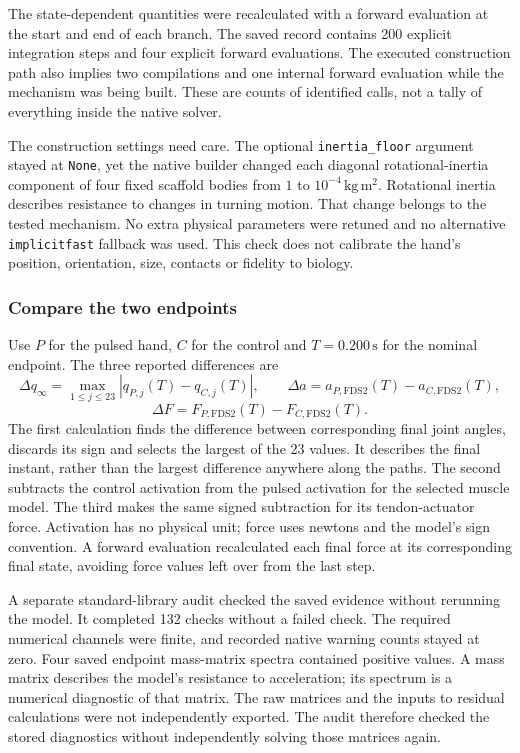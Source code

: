 The state-dependent quantities were recalculated with a forward evaluation at the start and end of each branch. The saved record contains 200 explicit integration steps and four explicit forward evaluations. The executed construction path also implies two compilations and one internal forward evaluation while the mechanism was being built. These are counts of identified calls, not a tally of everything inside the native solver.

The construction settings need care. The optional \texttt{inertia\_floor} argument stayed at \texttt{None}, yet the native builder changed each diagonal rotational-inertia component of four fixed scaffold bodies from $1$ to $10^{-4}\,\mathrm{kg\,m^2}$. Rotational inertia describes resistance to changes in turning motion. That change belongs to the tested mechanism. No extra physical parameters were retuned and no alternative \texttt{implicitfast} fallback was used. This check does not calibrate the hand's position, orientation, size, contacts or fidelity to biology.

\subsubsection{Compare the two endpoints}

Use $P$ for the pulsed hand, $C$ for the control and $T=0.200\,\mathrm{s}$ for the nominal endpoint. The three reported differences are
\[
\Delta q_{\infty}=\max_{1\leq j\leq23}|q_{P,j}(T)-q_{C,j}(T)|,
\qquad
\Delta a=a_{P,\mathrm{FDS2}}(T)-a_{C,\mathrm{FDS2}}(T),
\]
\[
\Delta F=F_{P,\mathrm{FDS2}}(T)-F_{C,\mathrm{FDS2}}(T).
\]
The first calculation finds the difference between corresponding final joint angles, discards its sign and selects the largest of the 23 values. It describes the final instant, rather than the largest difference anywhere along the paths. The second subtracts the control activation from the pulsed activation for the selected muscle model. The third makes the same signed subtraction for its tendon-actuator force. Activation has no physical unit; force uses newtons and the model's sign convention. A forward evaluation recalculated each final force at its corresponding final state, avoiding force values left over from the last step.



A separate standard-library audit checked the saved evidence without rerunning the model. It completed 132 checks without a failed check. The required numerical channels were finite, and recorded native warning counts stayed at zero. Four saved endpoint mass-matrix spectra contained positive values. A mass matrix describes the model's resistance to acceleration; its spectrum is a numerical diagnostic of that matrix. The raw matrices and the inputs to residual calculations were not independently exported. The audit therefore checked the stored diagnostics without independently solving those matrices again.

